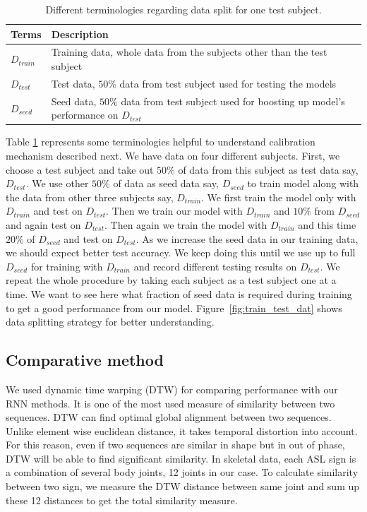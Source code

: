 \documentclass[10pt,twocolumn,letterpaper]{article}
\begin{document}
\begin{table}[h]
	\begin{center}
		\begin{tabular}{|m{1cm}|m{5cm}|}
			\hline
			Terms & Description\\
			\hline\hline
			$D_{train}$ & Training data, whole data from the subjects other than the test subject \\
			\hline
			$D_{test}$ & Test data, $50\%$ data from test subject used for testing the models\\
			\hline
			$D_{seed}$ & Seed data, $50\%$ data from test subject used for boosting up model's performance on $D_{test}$\\
			\hline
		\end{tabular}
	\end{center}
	\caption{Different terminologies regarding data split for one test subject.}
	\label{table:terminology_eval}
\end{table}

Table \ref{table:terminology_eval} represents some terminologies helpful to understand calibration mechanism described next.
We have data on four different subjects. First, we choose a test subject and take out $50\%$ of data from this subject as test data say, $D_{test}$. We use other $50\%$ of data as seed data say, $D_{seed}$ to train model along with the data from other three subjects say, $D_{train}$. We first train the model only with $D_{train}$ and test on $D_{test}$. Then we train our model with $D_{train}$ and $10\%$ from $D_{seed}$ and again test on $D_{test}$. Then again we train the model with $D_{train}$ and this time $20\%$ of $D_{seed}$ and test on $D_{test}$. As we increase the seed data in our training data, we should expect better test accuracy. We keep doing this until we use up to full $D_{seed}$ for training with $D_{train}$ and record different testing results on $D_{test}$. We repeat the whole procedure by taking each subject as a test subject one at a time. We want to see here what fraction of seed data is required during training to get a good performance from our model. Figure~\ref{fig:train_test_dat} shows data splitting strategy for better understanding.

\subsection{Comparative method}
We used dynamic time warping (DTW) for comparing performance with our RNN methods. It is one of the most used measure of similarity between two sequences. DTW can find optimal global alignment between two sequences. Unlike element wise euclidean distance, it takes temporal distortion into account. For this reason, even if two sequences are similar in shape but in out of phase, DTW will be able to find significant similarity. In skeletal data, each ASL sign is a combination of several body joints, 12 joints in our case. To calculate similarity between two sign, we measure the DTW distance between same joint and sum up these 12 distances to get the total similarity measure.
\end{document}
